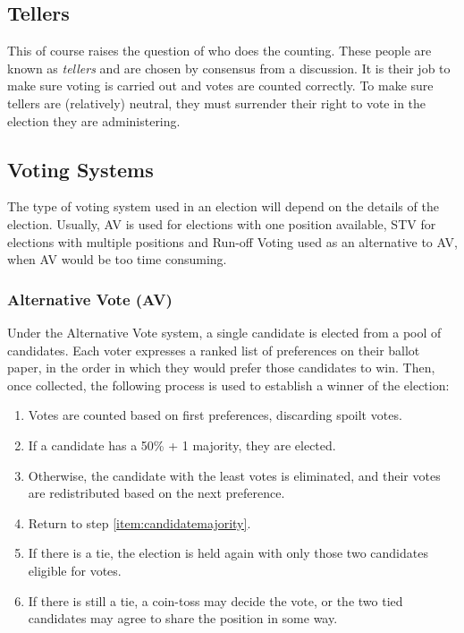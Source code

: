 \documentclass[a4paper, 11pt]{article} %
\begin{document}
\subsection{Tellers}
This of course raises the question of who does the counting.  These people are known as \emph{tellers} and are chosen by consensus from a discussion.  It is their job to make sure voting is carried out and votes are counted correctly.  To make sure tellers are (relatively) neutral, they must surrender their right to vote in the election they are administering.

\subsection{Voting Systems}
The type of voting system used in an election will depend on the details of the election.  Usually, AV is used for elections with one position available, STV for elections with multiple positions and Run-off Voting used as an alternative to AV, when AV would be too time consuming.

\subsubsection{Alternative Vote (AV)}
\label{sec:av}
Under the Alternative Vote system, a single candidate is elected from a pool of candidates.  Each voter expresses a ranked list of preferences on their ballot paper, in the order in which they would prefer those candidates to win.  Then, once collected, the following process is used to establish a winner of the election:

\begin{enumerate}
\item Votes are counted based on first preferences, discarding spoilt votes.
\item \label{item:candidatemajority} If a candidate has a 50\% + 1 majority, they are elected.
\item Otherwise, the candidate with the least votes is eliminated, and their votes are redistributed based on the next preference.
\item Return to step \ref{item:candidatemajority}.
\item If there is a tie, the election is held again with only those two candidates eligible for votes.
\item If there is still a tie, a coin-toss may decide the vote, or the two tied candidates may agree to share the position in some way.
\end{enumerate}
\end{document}
